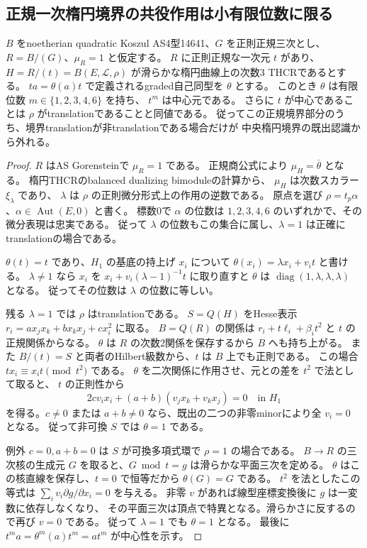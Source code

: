 \subsection{正規一次楕円境界の共役作用は小有限位数に限る}
\label{subsec:normal-elliptic-boundary}
\begin{theorem}[正規楕円境界の有限共役作用]
\label{thm:normal-elliptic-finite-conjugation}
$B$ をnoetherian quadratic Koszul AS4型14641、$G$ を正則正規三次とし、
$R=B/(G)$、$\mu_R=1$ と仮定する。
$R$ に正則正規な一次元 $t$ があり、
$H=R/(t)=B(E,\mathcal L,\rho)$ が滑らかな楕円曲線上の次数3 THCRであるとする。
$ta=\theta(a)t$ で定義されるgraded自己同型を $\theta$ とする。
このとき $\theta$ は有限位数 $m\in\{1,2,3,4,6\}$ を持ち、
$t^m$ は中心元である。
さらに $t$ が中心であることは $\rho$ がtranslationであることと同値である。
従ってこの正規境界部分のうち、境界translationが非translationである場合だけが
中央楕円境界の既出認識から外れる。
\end{theorem}
\begin{proof}
$R$ はAS Gorensteinで $\mu_R=1$ である。
正規商公式\cite[Lemma 1.5]{RRZ}により $\mu_H=\overline\theta$ となる。
楕円THCRのbalanced dualizing bimoduleの計算\cite[Example 7.16]{YeTHCR}から、
$\mu_H$ は次数スカラー $\xi_\lambda$ であり、
$\lambda$ は $\rho$ の正則微分形式上の作用の逆数である。
原点を選び $\rho=t_p\alpha$、$\alpha\in\operatorname{Aut}(E,0)$ と書く。
標数0で $\alpha$ の位数は $1,2,3,4,6$ のいずれかで、その微分表現は忠実である。
従って $\lambda$ の位数もこの集合に属し、$\lambda=1$ は正確にtranslationの場合である。

$\theta(t)=t$ であり、$H_1$ の基底の持上げ $x_i$ について
$\theta(x_i)=\lambda x_i+v_it$ と書ける。
$\lambda\ne1$ なら $x_i$ を $x_i+v_i(\lambda-1)^{-1}t$ に取り直すと
$\theta$ は $\operatorname{diag}(1,\lambda,\lambda,\lambda)$ となる。
従ってその位数は $\lambda$ の位数に等しい。

残る $\lambda=1$ では $\rho$ はtranslationである。
$S=Q(H)$ をHesse表示
$r_i=a x_jx_k+b x_kx_j+c x_i^2$ に取る。
$B=Q(R)$ の関係は $r_i+t\ell_i+\beta_i t^2$ と $t$ の正規関係からなる。
$\theta$ は $R$ の次数2関係を保存するから $B$ へも持ち上がる。
また $B/(t)=S$ と両者のHilbert級数から、$t$ は $B$ 上でも正則である。
この場合 $tx_i\equiv x_it\pmod{t^2}$ である。
$\theta$ を二次関係に作用させ、元との差を $t^2$ で法として取ると、
$t$ の正則性から
\[
 2cv_ix_i+(a+b)(v_jx_k+v_kx_j)=0\quad\text{in }H_1
\]
を得る。$c\ne0$ または $a+b\ne0$ なら、既出の二つの非零minorにより全 $v_i=0$ となる。
従って非可換 $S$ では $\theta=1$ である。

例外 $c=0,a+b=0$ は $S$ が可換多項式環で $\rho=1$ の場合である。
$B\to R$ の三次核の生成元 $G$ を取ると、$G\bmod t=g$ は滑らかな平面三次を定める。
$\theta$ はこの核直線を保存し、$t=0$ で恒等だから $\theta(G)=G$ である。
$t^2$ を法としたこの等式は
$\sum_i v_i\partial g/\partial x_i=0$ を与える。
非零 $v$ があれば線型座標変換後に $g$ は一変数に依存しなくなり、
その平面三次は頂点で特異となる。滑らかさに反するので再び $v=0$ である。
従って $\lambda=1$ でも $\theta=1$ となる。
最後に $t^ma=\theta^m(a)t^m=at^m$ が中心性を示す。
\end{proof}

